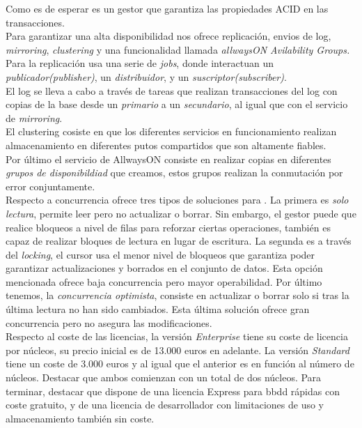 \documentclass{article}
\begin{document}
Como es de esperar es un gestor que garantiza las propiedades ACID en las transacciones.\\
Para garantizar una alta disponibilidad nos ofrece replicación, envios de log, \textit{mirroring}, \textit{clustering} y una funcionalidad llamada \textit{allwaysON Avilability Groups.}\\
Para la replicación usa una serie de \textit{jobs}, donde interactuan un \textit{publicador(publisher)}, un \textit{distribuidor}, y un \textit{suscriptor(subscriber)}.\\
El log se lleva a cabo a través de tareas que realizan transacciones del log con copias de la base desde un \textit{primario} a un \textit{secundario}, al igual que con el servicio de \textit{mirroring}.\\
El clustering cosiste en que los diferentes servicios en funcionamiento realizan almacenamiento en diferentes putos compartidos que son altamente fiables.\\
Por último el servicio de AllwaysON consiste en realizar copias en diferentes \textit{grupos de disponibildiad} que creamos, estos grupos realizan la conmutación por error conjuntamente.\\

Respecto a concurrencia ofrece tres tipos de soluciones para . La primera es \textit{solo lectura}, permite leer pero no actualizar o borrar. Sin embargo, el gestor puede que realice bloqueos a nivel de filas para reforzar ciertas operaciones, también es capaz de realizar bloques de lectura en lugar de escritura. La segunda es a través del \textit{locking}, el cursor usa el menor nivel de bloqueos que garantiza poder garantizar actualizaciones y borrados en el conjunto de datos. Esta opción mencionada ofrece baja concurrencia pero mayor operabilidad. Por último tenemos, la \textit{concurrencia optimista}, consiste en actualizar o borrar solo si tras la última lectura no han sido cambiados. Esta última solución ofrece gran concurrencia pero no asegura las modificaciones.\\
Respecto al coste de las licencias, la versión \textit{Enterprise} tiene su coste de licencia por núcleos, su precio inicial es de 13.000 euros en adelante. La versión \textit{Standard} tiene un coste de 3.000 euros y al igual que el anterior es en función al número de núcleos. Destacar que ambos comienzan con un total de dos núcleos. Para terminar, destacar que dispone de una licencia Express para bbdd rápidas con coste gratuito, y de una licencia de desarrollador con limitaciones de uso y almacenamiento también sin coste.








\newpage


\end{document}
